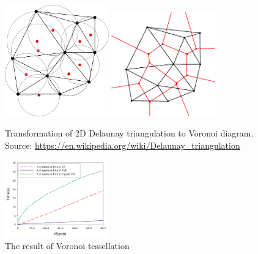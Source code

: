 \begin{figure}
	\centering
	\includegraphics[width=0.4\textwidth]{img/delaunay}
	\includegraphics[width=0.4\textwidth]{img/voronoi}
	\caption{Transformation of 2D Delaunay triangulation to Voronoi diagram. Source: \url{https://en.wikipedia.org/wiki/Delaunay\_triangulation}}
	\label{fig:DT}
\end{figure}
\begin{figure}
        \centering
        \includegraphics[width=0.4\textwidth]{img/clipped}
        \caption{The result of Voronoi tessellation \cite{yan2010efficient}}
        \label{fig:voro}
\end{figure}

